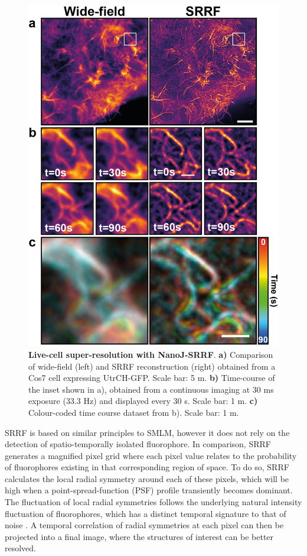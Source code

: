 \begin{figure}[!t]
    \centering
    \includegraphics[width=\linewidth]{Figures/Figure5_v1.png}
    \caption{\textbf{Live-cell super-resolution with NanoJ-SRRF}. \textbf{a)} Comparison of wide-field (left) and SRRF reconstruction (right) obtained from a Cos7 cell expressing UtrCH-GFP. Scale bar: 5 \micro m. \textbf{b)} Time-course of the inset shown in a), obtained from  a continuous imaging at 30 ms exposure (33.3 Hz) and displayed every 30 s. Scale bar: 1 \micro m. \textbf{c)} Colour-coded time course dataset from b). Scale bar: 1 \micro m.}
    \label{fig:SRRF}
\end{figure}
 
 SRRF is based on similar principles to SMLM, however it does not rely on the detection of spatio-temporally isolated fluorophore. In comparison, SRRF generates a magnified pixel grid where each pixel value relates to the probability of fluorophores existing in that corresponding region of space. To do so, SRRF calculates the local radial symmetry around each of these pixels, which will be high when a point-spread-function (PSF) profile transiently becomes dominant. The fluctuation of local radial symmetries follows the underlying natural intensity fluctuation of fluorophores, which has a distinct temporal signature to that of noise \cite{dertinger2009fast}. A temporal correlation of radial symmetries at each pixel can then be projected into a final image, where the structures of interest can be better resolved.
 
